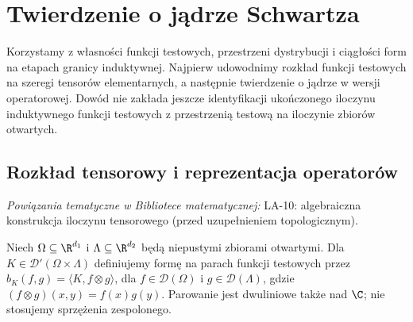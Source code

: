 
\section{Twierdzenie o jądrze Schwartza}
\label{sec:dt-schwartz-kernel}
\providecommand{\atlasref}[2]{#2}

Korzystamy z własności funkcji testowych, przestrzeni
dystrybucji i ciągłości form na etapach granicy induktywnej.
Najpierw udowodnimy rozkład funkcji testowych na szeregi
tensorów elementarnych, a następnie twierdzenie o jądrze
w wersji operatorowej. Dowód nie zakłada jeszcze
identyfikacji ukończonego iloczynu induktywnego funkcji
testowych z przestrzenią testową na iloczynie zbiorów otwartych.

\subsection{Rozkład tensorowy i reprezentacja operatorów}

\noindent\emph{Powiązania tematyczne w Bibliotece matematycznej:} \atlasref{LA-10::thm:lin10-istnienie}{LA-10: algebraiczna konstrukcja iloczynu tensorowego (przed uzupełnieniem topologicznym)}.


\begin{definicja}
\label{def:kernel-pair23}
Niech $\Omega\subseteq\R^{d_1}$ i
$\Lambda\subseteq\R^{d_2}$ będą niepustymi zbiorami otwartymi.
Dla $K\in\mathcal D'(\Omega\times\Lambda)$ definiujemy
formę na parach funkcji testowych przez
$b_K(f,g)=\langle K,f\otimes g\rangle$,
dla $f\in\mathcal D(\Omega)$ i $g\in\mathcal D(\Lambda)$,
gdzie $(f\otimes g)(x,y)=f(x)g(y)$.
Parowanie jest dwuliniowe także nad $\C$; nie stosujemy
sprzężenia zespolonego.
\end{definicja}

